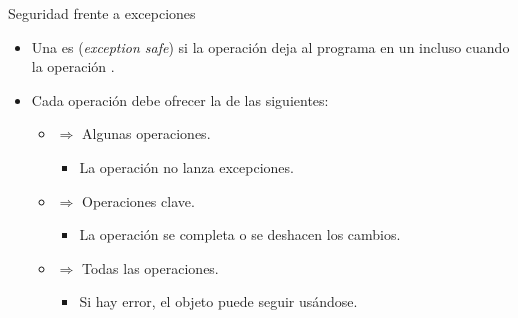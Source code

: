 \begin{frame}[t]{Seguridad frente a excepciones}
\begin{itemize}
  \item Una  es 
        (\emph{exception safe}) si la operación deja al programa en un 
         incluso cuando la operación 
        .

  \item Cada operación debe ofrecer la 
        de las siguientes:
    \begin{itemize}

      \item {} $\Rightarrow$ Algunas operaciones.
        \begin{itemize}
          \item La operación no lanza excepciones.
        \end{itemize}

      \item {} $\Rightarrow$ Operaciones clave.
        \begin{itemize}
          \item La operación se completa o se deshacen los cambios.
        \end{itemize}

      \item {} $\Rightarrow$ Todas las operaciones.
        \begin{itemize}
          \item Si hay error, el objeto puede seguir usándose.
        \end{itemize}
    \end{itemize}
\end{itemize}
\end{frame}

